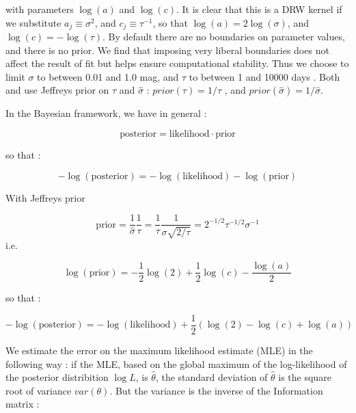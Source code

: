 \documentclass[fleqn,usenatbib]{mnras}  %
\begin{document}
with parameters  $\log{(a)}$ and $\log{(c)}$.    It is clear that this is a DRW kernel if we substitute  $a_{j} \equiv \sigma^{2}$, and  $c_{j} \equiv \tau^{-1}$, so that $\log{(a)} = 2 \log ( \sigma)$, and $\log{(c)} = - \log (\tau)$.  By default there are no boundaries on parameter values, and there is no prior.  We find that imposing very liberal boundaries does not affect the result of fit but helps ensure computational stability. Thus we choose to limit $\sigma$ to between 0.01 and 1.0 mag, and $\tau$ to between 1 and 10000 days . 
Both \cite{macleod2011}  and \cite{kozlowski2017a} use Jeffreys prior \citep{jeffreys46} on $\tau$ and $\hat{\sigma}$ : $prior(\tau) = 1 / \tau$ ,  and $prior(\hat{\sigma}) = 1 / \hat{\sigma}$. 


In the Bayesian framework, we have in general : 

\begin{equation}
\mathrm{posterior} = \mathrm{likelihood} \cdot \mathrm{prior}
\end{equation}

so that :

\begin{equation}
-\log{(\mathrm{posterior})} = -\log{(\mathrm{likelihood})} - \log{(\mathrm{prior})}
\end{equation}

With  Jeffreys prior

\begin{equation}
\mathrm{prior} = \frac{1}{\hat{\sigma}}\frac{1}{\tau} = \frac{1}{\tau}\frac{1}{\sigma\sqrt{2/\tau}}=2^{-1/2}\tau^{-1/2}\sigma^{-1}
\end{equation}
i.e. 

\begin{equation}
\log{(\mathrm{prior})} = -\frac{1}{2}\log{(2)} + \frac{1}{2}\log{(c)}-\frac{\log{(a)}}{2}
\end{equation}

so that :

\begin{equation}
-\log{(\mathrm{posterior})} = -\log{(\mathrm{likelihood})} + \frac{1}{2}\left( \log{(2)} - \log{(c)} + \log{(a)} \right) 
\end{equation}


We estimate the error on the maximum likelihood estimate (MLE) in  the following way : if the MLE, based on the global maximum of the log-likelihood of the posterior distribition $\log{L}$, is $\hat{\theta}$, the standard deviation of $\hat{\theta}$ is the square root of variance $var(\theta)$. But the variance is the inverse of the Information  matrix :
\end{document}
